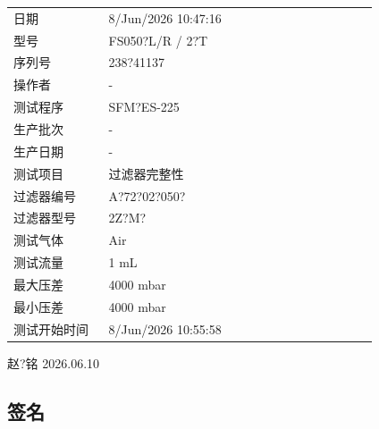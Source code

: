 \documentclass[UTF8,10pt,a4paper,fontset=fandol]{ctexart}
\newcommand{\fieldvalue}[1]{#1}
\newcommand{\handwritten}[1]{#1}
\begin{document}
\begin{tabular}{@{}p{0.24\linewidth}p{0.68\linewidth}@{}}
日期 &
\fieldvalue{8/Jun/2026 10:47:16}
\\[2pt]
型号 &
\fieldvalue{FS050?L/R / 2?T}
\\[2pt]
序列号 &
\fieldvalue{238?41137}
\\[2pt]
操作者 &
\fieldvalue{-}
\\[2pt]
测试程序 &
\fieldvalue{SFM?ES-225}
\\[2pt]
生产批次 &
\fieldvalue{-}
\\[2pt]
生产日期 &
\fieldvalue{-}
\\[2pt]
测试项目 &
\fieldvalue{过滤器完整性}
\\[2pt]
过滤器编号 &
\fieldvalue{A?72?02?050?}
\\[2pt]
过滤器型号 &
\fieldvalue{2Z?M?}
\\[2pt]
测试气体 &
\fieldvalue{Air}
\\[2pt]
测试流量 &
\fieldvalue{1 mL}
\\[2pt]
最大压差 &
\fieldvalue{4000 mbar}
\\[2pt]
最小压差 &
\fieldvalue{4000 mbar}
\\[2pt]
测试开始时间 &
\fieldvalue{8/Jun/2026 10:55:58}
\end{tabular}

\vspace{1em}

\handwritten{赵?铭}
\quad
\handwritten{2026.06.10}

\subsection{签名}
\end{document}
